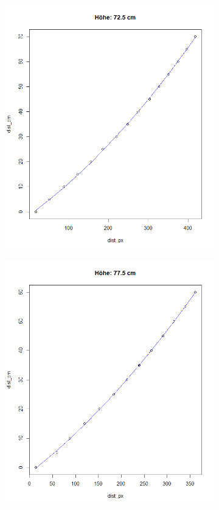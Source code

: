 \documentclass[a4paper]{report}
\begin{document}
\begin{figure}[h]
\begin{subfigure}[b]{0.3\textwidth}
	\end{subfigure}
	\quad
	\begin{subfigure}[b]{0.3\textwidth}
		\includegraphics[width=\textwidth]{hoehe72_5}
	\end{subfigure}
	\quad
	\begin{subfigure}[b]{0.3\textwidth}
		\includegraphics[width=\textwidth]{hoehe77_5}

\end{subfigure}
\end{figure}
\end{document}
